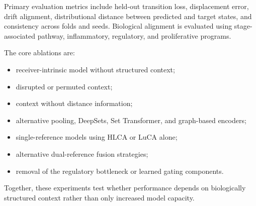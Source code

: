 Primary evaluation metrics include held-out transition loss, displacement error, drift alignment, distributional distance between predicted and target states, and consistency across folds and seeds. Biological alignment is evaluated using stage-associated pathway, inflammatory, regulatory, and proliferative programs.

The core ablations are:

\begin{itemize}
    \item receiver-intrinsic model without structured context;
    \item disrupted or permuted context;
    \item context without distance information;
    \item alternative pooling, DeepSets, Set Transformer, and graph-based encoders;
    \item single-reference models using HLCA or LuCA alone;
    \item alternative dual-reference fusion strategies;
    \item removal of the regulatory bottleneck or learned gating components.
\end{itemize}

Together, these experiments test whether performance depends on biologically structured context rather than only increased model capacity.


